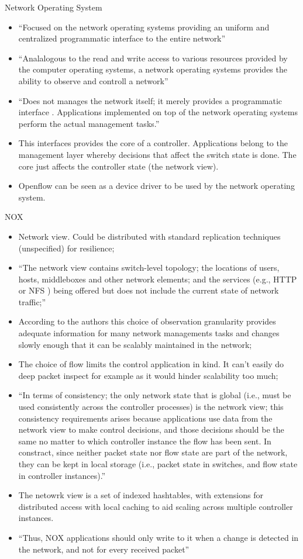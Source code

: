 \begin{itemize}
Network Operating System
\begin{itemize}
\item ``Focused on the network operating systems providing an uniform and centralized programmatic interface to the entire network''
\item ``Analalogous to the read and write access to various resources provided by the computer operating systems, a network operating systems provides the ability to observe and controll a network''
\item ``Does not manages the network itself; it merely provides a programmatic interface . Applications implemented on top of the network operating systems perform the actual management tasks.''
\item This interfaces provides the core of a controller. Applications belong to the management layer whereby decisions that affect the switch state is done. The core just affects the controller state (the network view). 
\item Openflow can be seen as a device driver to be used by the network operating system. 
\end{itemize}

NOX
\begin{itemize}
\item Network view.  Could be distributed with standard replication techniques (unspecified) for resilience; 
\item ``The network view contains switch-level topology; the locations of users, hosts, middleboxes and other network elements; and the services (e.g., HTTP or NFS )  being offered but does not include the current state of network traffic;''
\item According to the authors this choice of observation granularity provides adequate information for many network managements tasks and changes slowly enough that it can be scalably maintained in the network; 
\item The choice of flow limits the control application in kind. It can't easily do deep packet inspect for example as it would hinder scalability too much; 
\item ``In terms of consistency; the only network state that is global (i.e., must be used consistently across the controller processes) is the network view; this consistency requirements arises because applications use data from the network view to make control decisions, and those decisions should be the same no matter to which controller instance the flow has been sent. In constract, since neither packet state nor flow state are part of the network, they can be kept in local storage (i.e., packet state in switches, and flow state in controller instances).'' 
\item The netowrk view is a set of indexed hashtables, with extensions for distributed access with local caching to aid scaling across multiple controller instances. 
\item ``Thus, NOX applications should only write to it when a change is detected in the network, and not for every received packet'' 


\end{itemize}
\end{itemize}

